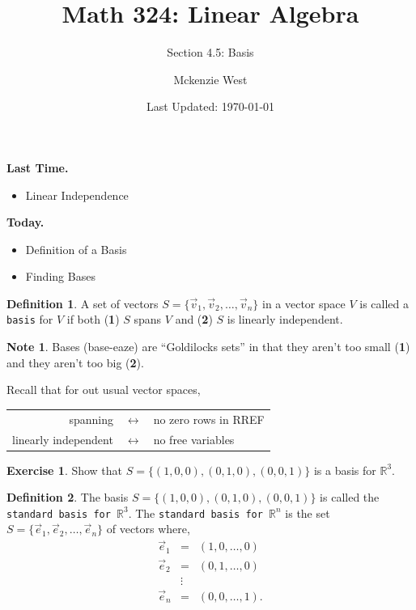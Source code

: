 \documentclass{beamer}
\newcommand{\R}{\mathbb{R}}
\newcommand{\fn}{\insertframenumber}
\theoremstyle{definition}
\newtheorem{exercise}{Exercise}
\newtheorem*{defn}{Definition}
\newtheorem*{nb}{Note}
\renewcommand{\emph}[1]{{\color{blue}\texttt{#1}}}
\begin{document}
	\title{Math 324: Linear Algebra}
	\subtitle{Section 4.5: Basis}
	\author{Mckenzie West}
	\date{Last Updated: \today}
\begin{frame}
\maketitle
\end{frame}

\begin{frame}{\insertframenumber}
	\begin{block}{\textbf{Last Time.}}
	\begin{itemize}[label=--]
		\item Linear Independence
	\end{itemize}
	\end{block}
	\begin{block}{\textbf{Today.}}
		\begin{itemize}[label=--]
			\item Definition of a Basis
			\item Finding Bases
		\end{itemize}
	\end{block}
\end{frame}
\begin{frame}{\fn}
	\begin{defn}
		A set of vectors $S=\{\vec v_1,\vec v_2,\dots,\vec v_n\}$ in a vector space $V$ is called a \emph{basis} for $V$ if both (\textbf{1}) $S$ spans $V$ and (\textbf{2}) $S$ is linearly independent.
	\end{defn}
	\begin{nb}
		Bases (base-eaze) are ``Goldilocks sets'' in that they aren't too small (\textbf{1}) and they aren't too big (\textbf{2}).
		
		Recall that for out usual vector spaces,
			\begin{center}
				\begin{tabular}{rcl} 
					spanning &$\longleftrightarrow$& no zero rows in RREF\\
					linearly independent &$\longleftrightarrow$& no free variables
			\end{tabular}
			\end{center}
	\end{nb}
\end{frame}
\begin{frame}{\fn}
	\begin{exercise}
		Show that $S=\{(1,0,0),(0,1,0),(0,0,1)\}$ is a basis for $\R^3$. 
	\end{exercise}\pause
	\begin{defn}
		The basis $S=\{(1,0,0),(0,1,0),(0,0,1)\}$ is called the \emph{standard basis for $\R^3$}.  The \emph{standard basis for $\R^n$} is the set $S=\{\vec e_1,\vec e_2,\dots,\vec e_n\}$ of vectors where,
			$$\begin{array}{rcl}
				\vec e_1&=&(1,0,\dots,0)\\
				\vec e_2 &=&(0,1,\dots,0)\\
				&\vdots\\
				\vec e_n&=&(0,0,\dots,1).
			\end{array}$$
	\end{defn}
\end{frame}
\end{document}
